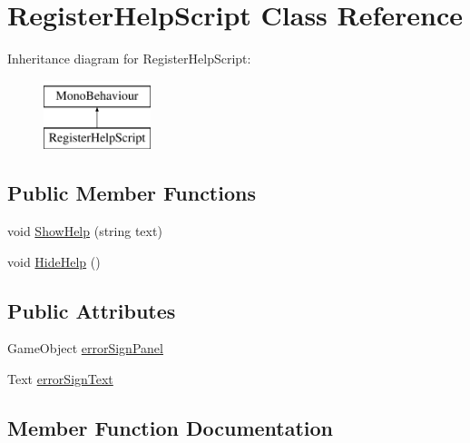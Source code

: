 \hypertarget{classRegisterHelpScript}{}\section{Register\+Help\+Script Class Reference}
\label{classRegisterHelpScript}
Inheritance diagram for Register\+Help\+Script\+:\begin{figure}[H]
\begin{center}
\leavevmode
\includegraphics[height=2.000000cm]{classRegisterHelpScript}
\end{center}
\end{figure}
\subsection*{Public Member Functions}
\begin{DoxyCompactItemize}
\item 
void \hyperlink{classRegisterHelpScript_a9551d32eabc8776a0d8d3ad00b6353a4}{Show\+Help} (string text)
\item 
void \hyperlink{classRegisterHelpScript_a8d9ff12dfee68412a16cc45042de4a5b}{Hide\+Help} ()
\end{DoxyCompactItemize}
\subsection*{Public Attributes}
\begin{DoxyCompactItemize}
\item 
Game\+Object \hyperlink{classRegisterHelpScript_acde7a21e97c96e438c0161c07c3cf2a5}{error\+Sign\+Panel}
\item 
Text \hyperlink{classRegisterHelpScript_a22eb0ba73a41e31e1e260d7536d3bebd}{error\+Sign\+Text}
\end{DoxyCompactItemize}


\subsection{Member Function Documentation}
\mbox{\label{classRegisterHelpScript_a8d9ff12dfee68412a16cc45042de4a5b}} 
